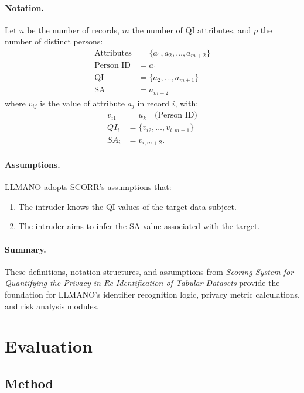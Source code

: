 \documentclass{article}
\begin{document}
\paragraph{Notation.}
Let $n$ be the number of records, $m$ the number of QI attributes, and $p$ the number of distinct persons:
\[
\begin{array}{rl}
\text{Attributes} &= \{a_1, a_2, \ldots, a_{m+2}\} \\
\text{Person ID} &= a_1 \\
\text{QI} &= \{a_2, \ldots, a_{m+1}\} \\
\text{SA} &= a_{m+2}
\end{array}
\]
where $v_{ij}$ is the value of attribute $a_j$ in record $i$, with:
\[
\begin{array}{rl}
v_{i1} &= u_k \quad \text{(Person ID)} \\
QI_i &= \{v_{i2}, \ldots, v_{i,m+1}\} \\
SA_i &= v_{i,m+2}.
\end{array}
\]

\paragraph{Assumptions.}
LLMANO adopts SCORR’s assumptions that:
\begin{enumerate}
    \item The intruder knows the QI values of the target data subject.
    \item The intruder aims to infer the SA value associated with the target.
\end{enumerate}

\paragraph{Summary.}
These definitions, notation structures, and assumptions from \emph{Scoring System for Quantifying the Privacy in Re-Identification of Tabular Datasets} provide the foundation for LLMANO’s identifier recognition logic, privacy metric calculations, and risk analysis modules.

\section{Evaluation}
\label{evaluation}

\subsection{Method}
\end{document}
